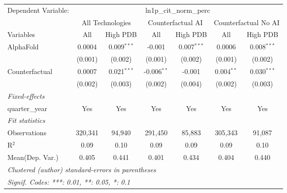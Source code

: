 \begingroup
\centering
\begin{tabular}{lcccccc}
   \tabularnewline \midrule \midrule
   Dependent Variable: & \multicolumn{6}{c}{ln1p\_cit\_norm\_perc}\\
 & \multicolumn{2}{c}{All Technologies} & \multicolumn{2}{c}{Counterfactual AI} & \multicolumn{2}{c}{Counterfactual No AI} \\
\cmidrule(lr){1-1}\cmidrule(lr){2-3} \cmidrule(lr){4-5} \cmidrule(lr){6-7}
Variables & \multicolumn{1}{c}{All} & \multicolumn{1}{c}{High PDB} & \multicolumn{1}{c}{All} & \multicolumn{1}{c}{High PDB} & \multicolumn{1}{c}{All} & \multicolumn{1}{c}{High PDB} \\
\cmidrule(lr){1-1}\cmidrule(lr){2-2} \cmidrule(lr){3-3} \cmidrule(lr){4-4} \cmidrule(lr){5-5} \cmidrule(lr){6-6} \cmidrule(lr){7-7}
   AlphaFold      & 0.0004  & 0.009$^{***}$ & -0.001        & 0.007$^{***}$ & 0.0006       & 0.008$^{***}$\\   
                  & (0.001) & (0.002)       & (0.001)       & (0.002)       & (0.001)      & (0.002)\\   
   Counterfactual & 0.0007  & 0.021$^{***}$ & -0.006$^{**}$ & -0.001        & 0.004$^{**}$ & 0.030$^{***}$\\   
                  & (0.002) & (0.003)       & (0.002)       & (0.004)       & (0.002)      & (0.003)\\   
   \midrule
   \emph{Fixed-effects}\\
   quarter\_year  & Yes     & Yes           & Yes           & Yes           & Yes          & Yes\\  
   \midrule
   \emph{Fit statistics}\\
   Observations   & 320,341 & 94,940        & 291,450       & 85,883        & 305,343      & 91,087\\  
   R$^2$          & 0.09    & 0.10          & 0.09          & 0.09          & 0.09         & 0.10\\  
Mean(Dep. Var.) & 0.405 & 0.441 & 0.401 & 0.434 & 0.404 & 0.440 \\
   \midrule \midrule
   \multicolumn{7}{l}{\emph{Clustered (author) standard-errors in parentheses}}\\
   \multicolumn{7}{l}{\emph{Signif. Codes: ***: 0.01, **: 0.05, *: 0.1}}\\
\end{tabular}
\par\endgroup
